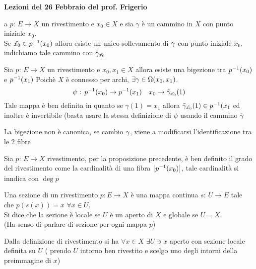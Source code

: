  

\textbf{Lezioni del 26  Febbraio del prof. Frigerio}
\begin{oss}a $p:\, E \to X$ un rivestimento e $x_0\in X$ e sia $\gamma$ \`e un cammino in $X$ con punto iniziale $x_0$.\\

Se $\tilde{x_0} \in p^{-1}(x_0)$ 
allora esiste un unico sollevamento di $\gamma$ con punto iniziale $\tilde{x_0}$, indichiamo tale cammino con 
$\tilde{\gamma}_{\tilde{x_0}}$

\end{oss}

\spazio
\begin{prop}Sia $p:\, E \to X$ un rivestimento e $x_0, x_1\in X$ allora esiste una bigezione tra $p^{-1} (x_0)$ e $p^{-1}(x_1)$ 
\proof Poich\`e $X$ \`e connesso per archi, $\exists \gamma \in \Omega(x_0,x_1)$.
$$ \psi:\, p^{-1}(x_0) \to p^{-1}(x_1) \quad 
x_0 \to \tilde{\gamma}_{\tilde{x_0}}(1)$$
Tale mappa \`e ben definita in quanto se $\gamma(1)=x_1$ allora $\tilde{\gamma}_{\tilde{x_0}}(1)\in p^{-1}(x_1$ ed inoltre \`e invertibile (basta usare la stessa definizione di $\psi$ usando il cammino $\overline{\gamma}$
\end{prop}
\begin{oss}La  bigezione non \`e canonica, se cambio $\gamma$, viene a modificarsi l'identificazione tra le 2 fibre
\end{oss}
\begin{defn}\bianco
Sia $p:\,E \to X$ rivestimento, per la proposizione precedente, \`e ben definito il grado del rivestimento come la cardinalit\`a di una fibra $\left\vert  p^{-1}(x_0)\right\vert$, tale cardinalit\`a si inndica con $\deg p$
\end{defn}
\spazio
\begin{defn}Una sezione di un rivestimento $p: E \to X$ \`e una mappa continua $s:\, U \to E$ tale che $p(s(x))=x \, \, \forall x \in U$.\\
Si dice che la sezione \`e locale se $U$ \`e un aperto di $X$ e globale se $U=X$.\\
(Ha senso di parlare di sezione per ogni mappa $p$)
\end{defn}
\begin{oss}Dalla definizione di rivestimento si ha $\forall x \in X\, \, \exists U \ni x $ aperto con sezione locale definita su $U$ ( prendo $U$ intorno ben rivestito e scelgo uno degli intorni della preimmagine di $x$)
\end{oss}
